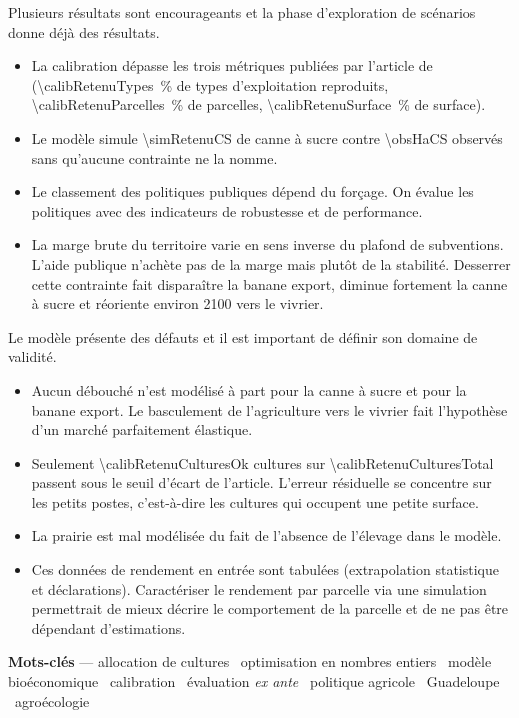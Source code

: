 Plusieurs résultats sont encourageants et la phase d'exploration de scénarios donne déjà des
résultats.
\begin{itemize}
\item La calibration dépasse les trois métriques publiées par l'article de \textcite{chopin2015}
(\SI{\calibRetenuTypes}{\percent} de types d'exploitation reproduits,
\SI{\calibRetenuParcelles}{\percent} de parcelles, \SI{\calibRetenuSurface}{\percent} de surface).
\item Le modèle simule \SI{\simRetenuCS}{\ha} de canne à sucre contre \SI{\obsHaCS}{\ha} observés sans
qu'aucune contrainte ne la nomme.
\item Le classement des politiques publiques dépend du forçage. On évalue les politiques avec des indicateurs
de robustesse et de performance.
\item La marge brute du territoire varie en sens inverse du plafond de subventions. L'aide publique
n'achète pas de la marge mais plutôt de la stabilité. Desserrer cette contrainte fait disparaître la
banane export, diminue fortement la canne à sucre et réoriente environ \SI{2100}{\ha} vers le vivrier.
\end{itemize}

Le modèle présente des défauts et il est important de définir son domaine de validité.
\begin{itemize}
\item Aucun débouché n'est modélisé à part pour la canne à sucre et pour la banane export. Le
basculement de l'agriculture vers le vivrier fait l'hypothèse d'un marché parfaitement élastique.
\item Seulement \num{\calibRetenuCulturesOk} cultures sur \num{\calibRetenuCulturesTotal} passent
sous le seuil d'écart de l'article. L'erreur résiduelle
se concentre sur les petits postes, c'est-à-dire les cultures qui occupent une petite surface.
\item La prairie est mal modélisée du fait de l'absence de l'élevage dans le modèle.
\item Ces données de rendement en entrée sont tabulées (extrapolation statistique et déclarations).
Caractériser le rendement par parcelle via une simulation permettrait de mieux décrire le
comportement de la parcelle et de ne pas être dépendant d'estimations.
\end{itemize}

\vfill
\noindent\textbf{Mots-clés} — allocation de cultures \textperiodcentered\ optimisation en
nombres entiers \textperiodcentered\ modèle bioéconomique \textperiodcentered\ calibration
\textperiodcentered\ évaluation \emph{ex ante} \textperiodcentered\ politique agricole
\textperiodcentered\ Guadeloupe \textperiodcentered\ agroécologie
